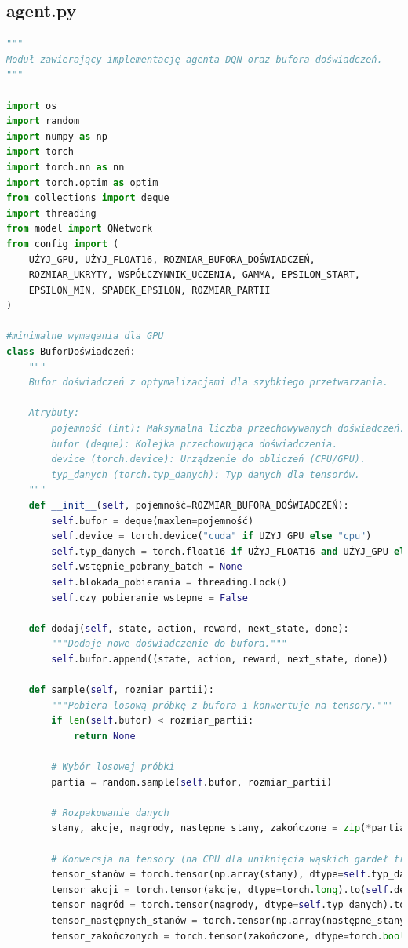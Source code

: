 \documentclass[a4paper,12pt]{article}
\begin{document}
\subsection{agent.py}
\begin{lstlisting}[language=Python]
"""
Moduł zawierający implementację agenta DQN oraz bufora doświadczeń.
"""

import os
import random
import numpy as np
import torch
import torch.nn as nn
import torch.optim as optim
from collections import deque
import threading
from model import QNetwork
from config import (
    UŻYJ_GPU, UŻYJ_FLOAT16, ROZMIAR_BUFORA_DOŚWIADCZEŃ,
    ROZMIAR_UKRYTY, WSPÓŁCZYNNIK_UCZENIA, GAMMA, EPSILON_START,
    EPSILON_MIN, SPADEK_EPSILON, ROZMIAR_PARTII
)

#minimalne wymagania dla GPU
class BuforDoświadczeń:
    """
    Bufor doświadczeń z optymalizacjami dla szybkiego przetwarzania.
    
    Atrybuty:
        pojemność (int): Maksymalna liczba przechowywanych doświadczeń.
        bufor (deque): Kolejka przechowująca doświadczenia.
        device (torch.device): Urządzenie do obliczeń (CPU/GPU).
        typ_danych (torch.typ_danych): Typ danych dla tensorów.
    """
    def __init__(self, pojemność=ROZMIAR_BUFORA_DOŚWIADCZEŃ):
        self.bufor = deque(maxlen=pojemność)
        self.device = torch.device("cuda" if UŻYJ_GPU else "cpu")
        self.typ_danych = torch.float16 if UŻYJ_FLOAT16 and UŻYJ_GPU else torch.float32
        self.wstępnie_pobrany_batch = None
        self.blokada_pobierania = threading.Lock()
        self.czy_pobieranie_wstępne = False
    
    def dodaj(self, state, action, reward, next_state, done):
        """Dodaje nowe doświadczenie do bufora."""
        self.bufor.append((state, action, reward, next_state, done))
    
    def sample(self, rozmiar_partii):
        """Pobiera losową próbkę z bufora i konwertuje na tensory."""
        if len(self.bufor) < rozmiar_partii:
            return None
            
        # Wybór losowej próbki
        partia = random.sample(self.bufor, rozmiar_partii)
        
        # Rozpakowanie danych
        stany, akcje, nagrody, następne_stany, zakończone = zip(*partia)
        
        # Konwersja na tensory (na CPU dla uniknięcia wąskich gardeł transferu)
        tensor_stanów = torch.tensor(np.array(stany), dtype=self.typ_danych).to(self.device)
        tensor_akcji = torch.tensor(akcje, dtype=torch.long).to(self.device)
        tensor_nagród = torch.tensor(nagrody, dtype=self.typ_danych).to(self.device)
        tensor_następnych_stanów = torch.tensor(np.array(następne_stany), dtype=self.typ_danych).to(self.device)
        tensor_zakończonych = torch.tensor(zakończone, dtype=torch.bool).to(self.device)
        

\end{lstlisting}
\end{document}

